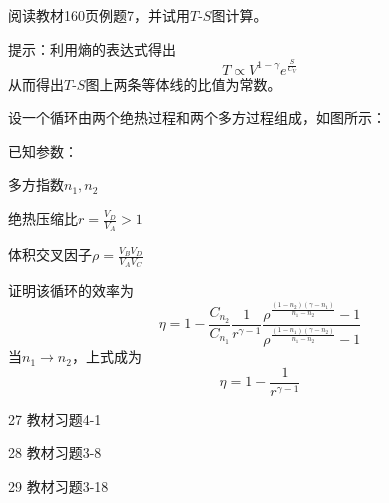 \documentclass[CJK]{beamer}
\begin{document}
\begin{frame}
\bch

阅读教材160页例题7，并试用$T$-$S$图计算。

\skiplines

{\small
提示：利用熵的表达式得出
$$ T \propto V^{1-\gamma} e^\frac{S}{C_V}$$
从而得出$T$-$S$图上两条等体线的比值为常数。
}
\ech
\end{frame}

\begin{frame}
\bch
设一个循环由两个绝热过程和两个多方过程组成，如图所示：
\emini
{}
{\small
已知参数：
\bitem
\item{多方指数$n_1, n_2$}
\item{绝热压缩比$r=\frac{V_D}{V_A}>1$}
\item{体积交叉因子$\rho =\frac{V_BV_D}{V_AV_C}$}
\eitem
}
\emini

{\small

证明该循环的效率为
$$\eta = 1 - \frac{C_{n_2}}{C_{n_1}}\frac{1}{r^{\gamma-1}}\frac{\rho^{\frac{(1-n_2)(\gamma-n_1)}{n_1-n_2}}-1}{\rho^{\frac{(1-n_1)(\gamma-n_2)}{n_1-n_2}}-1} $$
当$n_1\rightarrow n_2$，上式成为
$$\eta = 1- \frac{1}{r^{\gamma-1}}$$
}

\ech
\end{frame}



\begin{frame}
\bch
\bitem
\item[27]{教材习题4-1}
\item[28]{教材习题3-8}
\item[29]{教材习题3-18}
\eitem

\ech
\end{frame}
\end{document}
